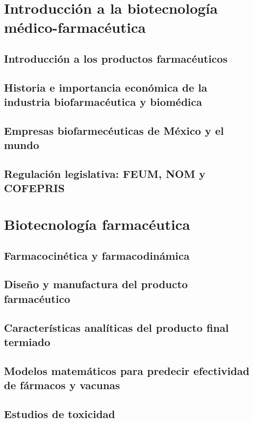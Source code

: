 \documentclass{../Resume}
\begin{document}
\Portada
\Indice
\fancystyle
\onehalfspacing


\part{Introducción a la biotecnología médico-farmacéutica}

    \chapter{Introducción a los productos farmacéuticos}
    \chapter{Historia e importancia económica de la industria biofarmacéutica y biomédica}
    \chapter{Empresas biofarmecéuticas de México y el mundo}
    \chapter{Regulación legislativa: FEUM, NOM y COFEPRIS}

\part{Biotecnología farmacéutica}

    \chapter{Farmacocinética y farmacodinámica}
    \chapter{Diseño y manufactura del producto farmacéutico}
    \chapter{Características analíticas del producto final termiado}
    \chapter{Modelos matemáticos para predecir efectividad de fármacos y vacunas}
    \chapter{Estudios de toxicidad}
\end{document}
